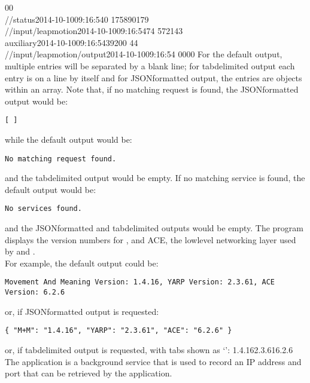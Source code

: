 0\pseudotab{}0\\
/\dollarService/status\pseudotab{}2014-10-10\pseudotab{}09:16:54\pseudotab{}0%
\pseudotab{}17589\pseudotab{}0\pseudotab{}179\\
/\serviceName/input/leapmotion\pseudotab{}2014-10-10\pseudotab{}09:16:54\pseudotab{}74%
\pseudotab{}5721\pseudotab{}4\pseudotab{}3\\
auxiliary\pseudotab{}2014-10-10\pseudotab{}09:16:54\pseudotab{}39\pseudotab{}200%
\pseudotab{}4\pseudotab{}4\\
/\serviceName/input/leapmotion/output\pseudotab{}2014-10-10\pseudotab{}09:16:54%
\pseudotab{}0\pseudotab{}0\pseudotab{}0\pseudotab{}0
\outputEnd{}
For the default output, multiple entries will be separated by a blank line; for
tab\longDash{}delimited output each entry is on a line by itself and for
JSON\longDash{}formatted output, the entries are objects within an array.
Note that, if no matching request is found, the JSON\longDash{}formatted output would be:
\outputBegin{}
\begin{verbatim}
[ ]
\end{verbatim}
\outputEnd{}
while the default output would be:
\outputBegin{}
\begin{verbatim}
No matching request found.
\end{verbatim}
\outputEnd{}
and the tab\longDash{}delimited output would be empty.
If no matching service is found, the default output would be:
\outputBegin{}
\begin{verbatim}
No services found.
\end{verbatim}
\outputEnd{}
and the JSON\longDash{}formatted and tab\longDash{}delimited outputs would be empty.
The program  displays the version numbers for \mplusm{}, \yarp{}
and ACE, the low\longDash{}level networking layer used by \mplusm{} and \yarp{}.\\

For example, the default output could be:
\outputBegin{}
\begin{verbatim}
Movement And Meaning Version: 1.4.16, YARP Version: 2.3.61, ACE Version: 6.2.6
\end{verbatim}
\outputEnd{}
or, if JSON\longDash{}formatted output is requested:
\outputBegin{}
\begin{verbatim}
{ "M+M": "1.4.16", "YARP": "2.3.61", "ACE": "6.2.6" }
\end{verbatim}
\outputEnd{}
or, if tab\longDash{}delimited output is requested, with tabs shown as `\tabSymbol':
\outputBegin{}
1.4.16\pseudotab{}2.3.61\pseudotab{}6.2.6
\outputEnd{}
\secondaryEnd{}
\condPage{}
The  application is a background service that is used to
record an IP address and port that can be retrieved by the 
application.\\

